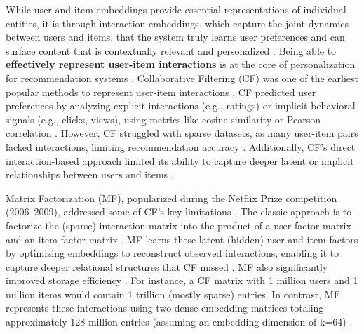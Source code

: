 \documentclass[final]{anthology-ch}         %
\begin{document}
While user and item embeddings provide essential representations of individual entities, it is through interaction embeddings, which capture the joint dynamics between users and items, that the system truly learns user preferences and can surface content that is contextually relevant and personalized \cite{koren2009matrix}. Being able to \textbf{ effectively represent user-item interactions} is at the core of personalization for recommendation systems \cite{linden2003amazon}. Collaborative Filtering (CF) was one of the earliest popular methods to represent user-item interactions \cite{linden2003amazon, Bobadilla2013}. CF predicted user preferences by analyzing explicit interactions (e.g., ratings) or implicit behavioral signals (e.g., clicks, views), using metrics like cosine similarity or Pearson correlation \cite{Bobadilla2013}. However, CF struggled with sparse datasets, as many user-item pairs lacked interactions, limiting recommendation accuracy \cite{Bobadilla2013}. Additionally, CF's direct interaction-based approach limited its ability to capture deeper latent or implicit relationships between users and items \cite{koren2008factorization}.

Matrix Factorization (MF), popularized during the Netflix Prize competition (2006–2009), addressed some of CF’s key limitations \cite{bennett2007netflix}. The classic approach is to factorize the (sparse) interaction matrix into the product of a user-factor matrix and an item-factor matrix \cite{koren2009matrix}. MF learns these latent (hidden) user and item factors by optimizing embeddings to reconstruct observed interactions, enabling it to capture deeper relational structures that CF missed \cite{koren2009matrix}. MF also significantly improved storage efficiency \cite{koren2009matrix}. For instance, a CF matrix with 1 million users and 1 million items would contain 1 trillion (mostly sparse) entries. In contrast, MF represents these interactions using two dense embedding matrices totaling approximately 128 million entries (assuming an embedding dimension of k=64) \cite{koren2009matrix}.
\end{document}

